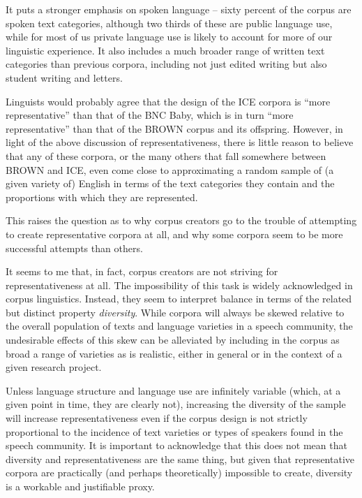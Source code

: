 It puts a stronger emphasis on spoken language -- sixty percent of the corpus are spoken  text categories, although two thirds of these are public language use, while for most of us private language use is likely to account for more of our linguistic experience. It also includes a much broader range of written  text categories than previous corpora, including not just edited writing but also student writing and letters.

Linguists would probably agree that the design  of the ICE  corpora is ``more representative'' than that of the BNC Baby,  which is in turn ``more representative'' than that of the BROWN  corpus and its offspring. However, in light of the above discussion of representativeness,  there is little reason to believe that any of these corpora, or the many others that fall somewhere between BROWN  and ICE,  even come close to approximating a random  sample  of (a given variety  of) English in terms of the text categories they contain and the proportions with which they are represented.

This raises the question as to why corpus creators go to the trouble of attempting to create representative corpora at all, and why some corpora seem to be more successful attempts than others.

It seems to me that, in fact, corpus creators are not striving for representativeness at all. The impossibility of this task is widely acknowledged in corpus linguistics. Instead, they seem to interpret balance in terms of the related but distinct property \emph{diversity}. While corpora will always be skewed relative to the overall population of texts and language varieties  in a speech community, the undesirable effects of this skew can be alleviated by including in the corpus as broad a range of varieties as is realistic, either in general or in the context of a given research project.

Unless language structure and language use are infinitely variable (which, at a given point in time, they are clearly not), increasing the diversity of the sample  will increase representativeness  even if the corpus design  is not strictly proportional to the incidence of text varieties or types of speakers found in the speech community. It is important to acknowledge that this does not mean that diversity and representativeness are the same thing, but given that representative corpora are practically (and perhaps theoretically) impossible to create, diversity is a workable and justifiable proxy.

